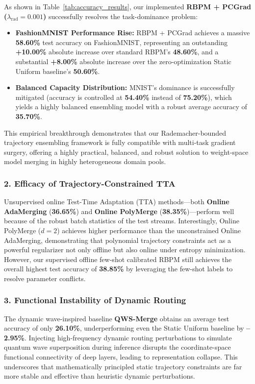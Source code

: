 As shown in Table~\ref{tab:accuracy_results}, our implemented \textbf{RBPM + PCGrad ($\lambda_{\text{rad}} = 0.001$)} successfully resolves the task-dominance problem:
\begin{itemize}
    \item \textbf{FashionMNIST Performance Rise:} RBPM + PCGrad achieves a massive \textbf{58.60\%} test accuracy on FashionMNIST, representing an outstanding \textbf{+10.00\%} absolute increase over standard RBPM's \textbf{48.60\%}, and a substantial \textbf{+8.00\%} absolute increase over the zero-optimization Static Uniform baseline's \textbf{50.60\%}.
    \item \textbf{Balanced Capacity Distribution:} MNIST's dominance is successfully mitigated (accuracy is controlled at \textbf{54.40\%} instead of \textbf{75.20\%}), which yields a highly balanced ensembling model with a robust average accuracy of \textbf{35.70\%}.
\end{itemize}
This empirical breakthrough demonstrates that our Rademacher-bounded trajectory ensembling framework is fully compatible with multi-task gradient surgery, offering a highly practical, balanced, and robust solution to weight-space model merging in highly heterogeneous domain pools.

\subsubsection{2. Efficacy of Trajectory-Constrained TTA}
Unsupervised online Test-Time Adaptation (TTA) methods—both \textbf{Online AdaMerging} (\textbf{36.65\%}) and \textbf{Online PolyMerge} (\textbf{38.35\%})—perform well because of the robust batch statistics of the test streams. Interestingly, Online PolyMerge ($d=2$) achieves higher performance than the unconstrained Online AdaMerging, demonstrating that polynomial trajectory constraints act as a powerful regularizer not only offline but also online under entropy minimization. However, our supervised offline few-shot calibrated RBPM still achieves the overall highest test accuracy of \textbf{38.85\%} by leveraging the few-shot labels to resolve parameter conflicts.

\subsubsection{3. Functional Instability of Dynamic Routing}
The dynamic wave-inspired baseline \textbf{QWS-Merge} obtains an average test accuracy of only \textbf{26.10\%}, underperforming even the Static Uniform baseline by \textbf{--2.95\%}. Injecting high-frequency dynamic routing perturbations to simulate quantum wave superposition during inference disrupts the coordinate-space functional connectivity of deep layers, leading to representation collapse. This underscores that mathematically principled static trajectory constraints are far more stable and effective than heuristic dynamic perturbations.

